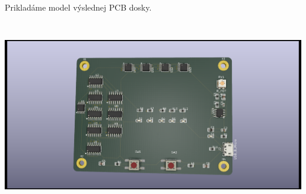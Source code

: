 Prikladáme model výslednej PCB dosky.
\begin{center}
    \includegraphics[width=17cm, height=8.4cm]{images/PB170.png}
\end{center}








